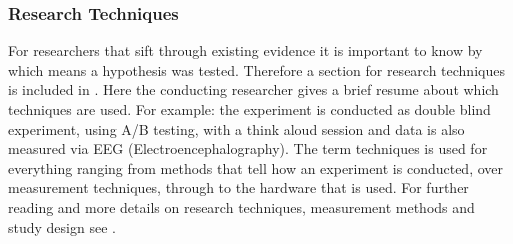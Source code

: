 
\subsubsection{Research Techniques}

For researchers that sift through existing evidence it is important to know by which means a hypothesis was tested. Therefore a section for research techniques is included in \briefingform. Here the conducting researcher gives a brief resume about which techniques are used. For example: the experiment is conducted as double blind experiment, using A/B testing, with a think aloud session and data is also measured via EEG (Electroencephalography). The term techniques is used for everything ranging from methods that tell how an experiment is conducted, over measurement techniques, through to the hardware that is used. For further reading and more details on research techniques, measurement methods and study design see \cite{Albert2008,Wohlin2012}.
